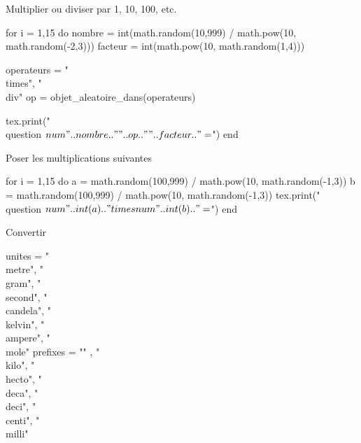 \documentclass[../Cours.tex]{subfiles}
\begin{document}
\clearpage
\begin{questions}
    \exercice Multiplier ou diviser par 1, 10, 100, etc.
        \begin{multicols}{3}
        \begin{luacode}
            for i = 1,15
            do
                nombre = int(math.random(10,999) / math.pow(10, math.random(-2,3)))
                facteur = int(math.pow(10, math.random(1,4)))
                
                operateurs = {"\\times", "\\div"}
                op = objet_aleatoire_dans(operateurs)
                
                tex.print("\\question $\\num{" .. nombre .. "}" .. op .. " " .. facteur .. " = $")
            end
        \end{luacode}
        \end{multicols}
    \exercice Poser les multiplications suivantes 
        \begin{multicols}{3}
        \begin{luacode}
            for i = 1,15
            do
                a = math.random(100,999) / math.pow(10, math.random(-1,3))
                b = math.random(100,999) / math.pow(10, math.random(-1,3))
                tex.print("\\question $\\num{" .. int(a) .. "} \\times \\num{" .. int(b) .. "} =$")
            end
        \end{luacode}
        \end{multicols}
    \exercice Convertir 
        \begin{multicols}{3}
        \begin{luacode}
            unites = {"\\metre", "\\gram", "\\second", "\\candela", "\\kelvin", "\\ampere", "\\mole"}
            prefixes = {"" , "\\kilo", "\\hecto", "\\deca", "\\deci", "\\centi", "\\milli"}


\end{luacode}
\end{multicols}
\end{questions}
\end{document}

